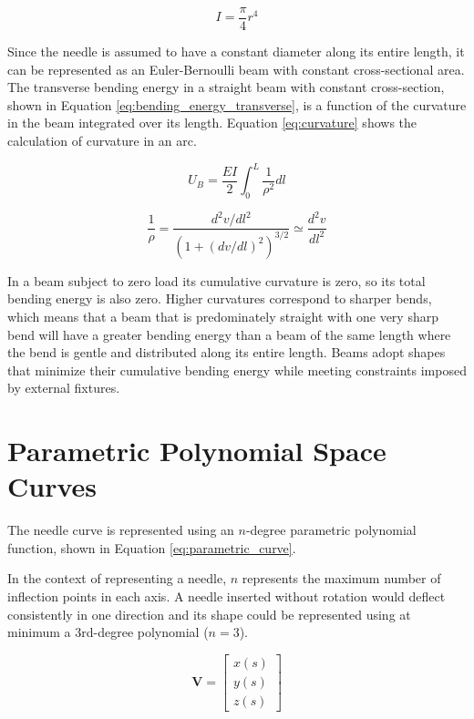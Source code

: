 \begin{equation}
\label{eq:beam_inertia}
I = \frac{\pi}{4}r^4
\end{equation}


Since the needle is assumed to have a constant diameter along its entire length, it can be represented as an Euler-Bernoulli beam with constant cross-sectional area. The transverse bending energy in a straight beam with constant cross-section, shown in Equation \ref{eq:bending_energy_transverse}, is a function of the curvature in the beam integrated over its length. Equation \ref{eq:curvature} shows the calculation of curvature in an arc.

\begin{equation}
\label{eq:bending_energy_transverse}
U_B = \frac{EI}{2}\int_{0}^{L}\frac{1}{\rho^2}dl
\end{equation}

\begin{equation}
\label{eq:curvature}
\frac{1}{\rho} = \frac{d^2v/dl^2}{(1+(dv/dl)^2)^{3/2}} \simeq \frac{d^2v}{dl^2}
\end{equation}

In a beam subject to zero load its cumulative curvature is zero, so its total bending energy is also zero. Higher curvatures correspond to sharper bends, which means that a beam that is predominately straight with one very sharp bend will have a greater bending energy than a beam of the same length where the bend is gentle and distributed along its entire length. Beams adopt shapes that minimize their cumulative bending energy while meeting constraints imposed by external fixtures.


\section{Parametric Polynomial Space Curves}
The needle curve is represented using an $n$-degree parametric polynomial function, shown in Equation \ref{eq:parametric_curve}.


In the context of representing a needle, $n$ represents the maximum number of inflection points in each axis. A needle inserted without rotation would deflect consistently in one direction and its shape could be represented using at minimum a 3rd-degree polynomial ($n=3$).

\begin{equation}
\label{eq:curve_vector}
\textbf{V}=\begin{bmatrix}x(s) \\ y(s) \\ z(s) \end{bmatrix}
 \end{equation}

